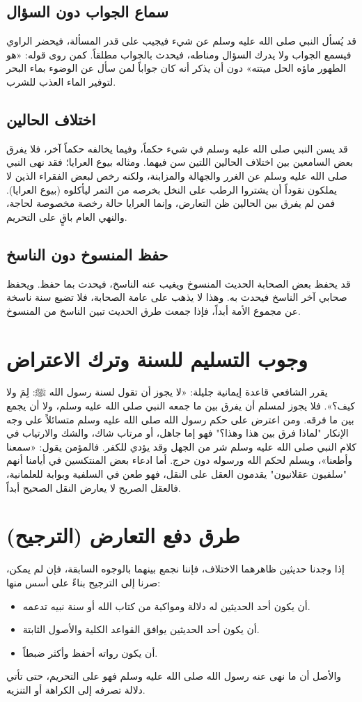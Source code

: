 \subsection{سماع الجواب دون السؤال}
قد يُسأل النبي صلى الله عليه وسلم عن شيء فيجيب على قدر المسألة، فيحضر الراوي فيسمع الجواب ولا يدرك السؤال ومناطه، فيحدث بالجواب مطلقاً. كمن روى قوله: «هو الطهور ماؤه الحل ميتته» دون أن يذكر أنه كان جواباً لمن سأل عن الوضوء بماء البحر لتوفير الماء العذب للشرب.

\subsection{اختلاف الحالين}
قد يسن النبي صلى الله عليه وسلم في شيء حكماً، وفيما يخالفه حكماً آخر، فلا يفرق بعض السامعين بين اختلاف الحالين اللتين سن فيهما. 
ومثاله بيوع العرايا؛ فقد نهى النبي صلى الله عليه وسلم عن الغرر والجهالة والمزابنة، ولكنه رخص لبعض الفقراء الذين لا يملكون نقوداً أن يشتروا الرطب على النخل بخرصه من التمر ليأكلوه (بيوع العرايا). فمن لم يفرق بين الحالين ظن التعارض، وإنما العرايا حالة رخصة مخصوصة لحاجة، والنهي العام باقٍ على التحريم.

\subsection{حفظ المنسوخ دون الناسخ}
قد يحفظ بعض الصحابة الحديث المنسوخ ويغيب عنه الناسخ، فيحدث بما حفظ. ويحفظ صحابي آخر الناسخ فيحدث به. وهذا لا يذهب على عامة الصحابة، فلا تضيع سنة ناسخة عن مجموع الأمة أبداً، فإذا جمعت طرق الحديث تبين الناسخ من المنسوخ.

\section{وجوب التسليم للسنة وترك الاعتراض}
يقرر الشافعي قاعدة إيمانية جليلة: «لا يجوز أن تقول لسنة رسول الله ﷺ: لِمَ ولا كيف؟». 
فلا يجوز لمسلم أن يفرق بين ما جمعه النبي صلى الله عليه وسلم، ولا أن يجمع بين ما فرقه. ومن اعترض على حكم رسول الله صلى الله عليه وسلم متسائلاً على وجه الإنكار "لماذا فرق بين هذا وهذا؟" فهو إما جاهل، أو مرتاب شاك، والشك والارتياب في كلام النبي صلى الله عليه وسلم شر من الجهل وقد يؤدي للكفر.
فالمؤمن يقول: «سمعنا وأطعنا»، ويسلم لحكم الله ورسوله دون حرج. أما ادعاء بعض المنتكسين في أيامنا أنهم "سلفيون عقلانيون" يقدمون العقل على النقل، فهو طعن في السلفية وبوابة للعلمانية، فالعقل الصريح لا يعارض النقل الصحيح أبداً.

\section{طرق دفع التعارض (الترجيح)}
إذا وجدنا حديثين ظاهرهما الاختلاف، فإننا نجمع بينهما بالوجوه السابقة، فإن لم يمكن، صرنا إلى الترجيح بناءً على أسس منها:
\begin{itemize}
    \item أن يكون أحد الحديثين له دلالة ومواكبة من كتاب الله أو سنة نبيه تدعمه.
    \item أن يكون أحد الحديثين يوافق القواعد الكلية والأصول الثابتة.
    \item أن يكون رواته أحفظ وأكثر ضبطاً.
\end{itemize}
والأصل أن ما نهى عنه رسول الله صلى الله عليه وسلم فهو على التحريم، حتى تأتي دلالة تصرفه إلى الكراهة أو التنزيه.